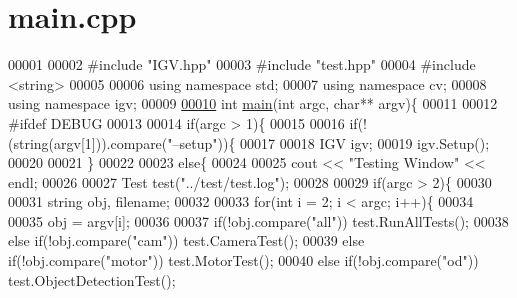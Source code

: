 \hypertarget{main_8cpp_source}{}\section{main.\+cpp}
\label{main_8cpp_source}

\begin{DoxyCode}
00001 
00002 \textcolor{preprocessor}{#}\textcolor{preprocessor}{include} \textcolor{preprocessor}{"IGV.hpp"}
00003 \textcolor{preprocessor}{#}\textcolor{preprocessor}{include} \textcolor{preprocessor}{"test.hpp"}
00004 \textcolor{preprocessor}{#}\textcolor{preprocessor}{include} \textcolor{preprocessor}{<}\textcolor{preprocessor}{string}\textcolor{preprocessor}{>}
00005 
00006 \textcolor{keyword}{using} \textcolor{keyword}{namespace} std;
00007 \textcolor{keyword}{using} \textcolor{keyword}{namespace} cv;
00008 \textcolor{keyword}{using} \textcolor{keyword}{namespace} igv;
00009 
\hyperlink{main_8cpp_a3c04138a5bfe5d72780bb7e82a18e627}{00010} \textcolor{keywordtype}{int} \hyperlink{main_8cpp_a3c04138a5bfe5d72780bb7e82a18e627}{main}(\textcolor{keywordtype}{int} argc, \textcolor{keywordtype}{char}** argv)\{
00011 
00012 \textcolor{preprocessor}{#}\textcolor{preprocessor}{ifdef} \textcolor{preprocessor}{DEBUG}
00013 
00014   \textcolor{keywordflow}{if}(argc > 1)\{
00015 
00016     \textcolor{keywordflow}{if}(!(string(argv[1])).compare(\textcolor{stringliteral}{"--setup"}))\{
00017 
00018       IGV igv;
00019       igv.Setup();
00020 
00021     \}
00022 
00023     \textcolor{keywordflow}{else}\{
00024 
00025       cout << \textcolor{stringliteral}{"Testing Window"} << endl;
00026 
00027       Test test(\textcolor{stringliteral}{"../test/test.log"});
00028 
00029       \textcolor{keywordflow}{if}(argc > 2)\{
00030 
00031         string obj, filename;
00032 
00033         \textcolor{keywordflow}{for}(\textcolor{keywordtype}{int} i = 2; i < argc; i++)\{
00034 
00035           obj = argv[i];
00036 
00037           \textcolor{keywordflow}{if}(!obj.compare(\textcolor{stringliteral}{"all"}))           test.RunAllTests();
00038           \textcolor{keywordflow}{else} \textcolor{keywordflow}{if}(!obj.compare(\textcolor{stringliteral}{"cam"}))      test.CameraTest();
00039           \textcolor{keywordflow}{else} \textcolor{keywordflow}{if}(!obj.compare(\textcolor{stringliteral}{"motor"}))    test.MotorTest();
00040           \textcolor{keywordflow}{else} \textcolor{keywordflow}{if}(!obj.compare(\textcolor{stringliteral}{"od"}))       test.ObjectDetectionTest();

\end{DoxyCode}
